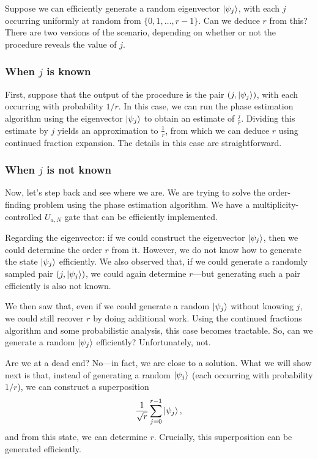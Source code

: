Suppose we can efficiently generate a random eigenvector $\ket{\psi_j}$, with each $j$ occurring uniformly at random from $\{0, 1, \ldots, r-1\}$. Can we deduce $r$ from this? There are two versions of the scenario, depending on whether or not the procedure reveals the value of $j$.

\subsubsection{When $j$ is known}
First, suppose that the output of the procedure is the pair $(j, \ket{\psi_j})$, with each occurring with probability $1/r$. In this case, we can run the phase estimation algorithm using the eigenvector $\ket{\psi_j}$ to obtain an estimate of $\frac{j}{r}$. Dividing this estimate by $j$ yields an approximation to $\frac{1}{r}$, from which we can deduce $r$ using continued fraction expansion. The details in this case are straightforward.

\subsubsection{When $j$ is not known}

Now, let's step back and see where we are. We are trying to solve the order-finding problem using the phase estimation algorithm. We have a multiplicity-controlled $U_{a,N}$ gate that can be efficiently implemented.

Regarding the eigenvector: if we could construct the eigenvector $\ket{\psi_j}$, then we could determine the order $r$ from it. However, we do not know how to generate the state $\ket{\psi_j}$ efficiently. We also observed that, if we could generate a randomly sampled pair $(j, \ket{\psi_j})$, we could again determine $r$—but generating such a pair efficiently is also not known.

We then saw that, even if we could generate a random $\ket{\psi_j}$ without knowing $j$, we could still recover $r$ by doing additional work. Using the continued fractions algorithm and some probabilistic analysis, this case becomes tractable. So, can we generate a random $\ket{\psi_j}$ efficiently? Unfortunately, not.

Are we at a dead end? No—in fact, we are close to a solution. What we will show next is that, instead of generating a random $\ket{\psi_j}$ (each occurring with probability $1/r$), we can construct a superposition
\[
\frac{1}{\sqrt{r}} \sum_{j=0}^{r-1} \ket{\psi_j},
\]
and from this state, we can determine $r$. Crucially, this superposition can be generated efficiently.

